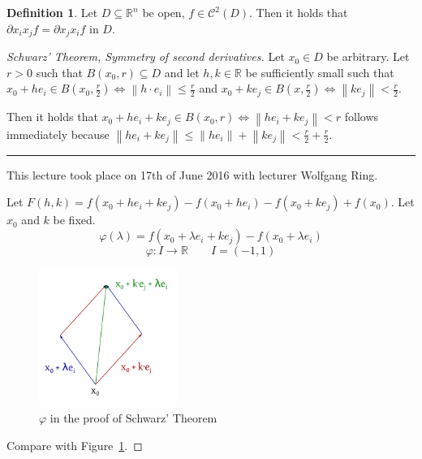 \documentclass[a4paper,landscape,twocolumn]{article}
\theoremstyle{definition}
\newtheorem{defi}{Definition}
\newcommand\meta[3]{\hrule{} This #1 took place on #2 with lecturer #3.\par}
\newcommand\norm[1]{\left\|#1\right\|}
\begin{document}
\begin{defi}
  Let $D \subseteq \mathbb R^n$ be open, $f \in \mathcal{C}^2(D)$. Then it holds
  that $\partial x_i x_j f = \partial x_j x_i f$ in $D$.
\end{defi}
\begin{proof}[Schwarz' Theorem, Symmetry of second derivatives]
  Let $x_0 \in D$ be arbitrary. Let $r > 0$ such that $B(x_0, r) \subseteq D$
  and let $h,k \in \mathbb R$ be sufficiently small such that
  $x_0 + he_i \in B(x_0, \frac r2) \iff \norm{h \cdot e_i} \leq \frac r2$
  and $x_0 + ke_j \in B(x, \frac r2) \iff \norm{k e_j} < \frac r2$.

  Then it holds that $x_0 + he_i + ke_j \in B(x_0, r) \iff \norm{he_i + ke_j} < r$
  follows immediately because $\norm{he_i + ke_j} \leq \norm{he_i} + \norm{ke_j} < \frac r2 + \frac r2$.
  \meta{lecture}{17th of June 2016}{Wolfgang Ring}

  Let $F(h,k) = f(x_0 + he_i + ke_j) - f(x_0 + he_i) - f(x_0 + ke_j) + f(x_0)$.
  Let $x_0$ and $k$ be fixed.
  \[ \varphi(\lambda) = f(x_0 + \lambda e_i + k e_j) - f(x_0 + \lambda e_i) \]
  \[ \varphi: I \to \mathbb R \qquad I = (-1,1) \]
  \begin{figure}[!h]
    \begin{center}
      \includegraphics[width=0.4\textwidth]{img/schwarz-proof.pdf}
      \caption{$\varphi$ in the proof of Schwarz' Theorem}
      \label{img:schw-proof}
    \end{center}
  \end{figure}
  Compare with Figure~\ref{img:schw-proof}.


\end{proof}
\end{document}
